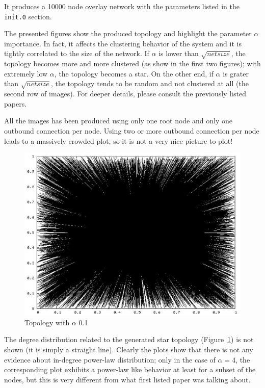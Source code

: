 \documentclass[a4paper,12pt]{article}
\begin{document}
It produces a 10000 node overlay network with the parameters listed in 
the \texttt{init.0} section.

The presented figures show the produced topology and highlight the 
parameter $\alpha$ importance. In fact, it affects the clustering behavior of 
the system and it is tightly correlated to the size of the network. If 
$\alpha$ is lower than $\sqrt{netsize}$, the topology becomes more and more 
clustered (as show in the first two figures); with extremely low $\alpha$, 
the topology becomes a star. On the other end, if $\alpha$ is grater than 
$\sqrt{netsize}$, the topology tends to be random and not clustered at all 
(the second row of images). For deeper details, please consult the previously
listed papers.

All the images has been produced using only one root node and only 
one outbound connection per node. Using two or more outbound connection 
per node leads to a massively crowded plot, so it is not a very nice picture 
to plot!

\begin{figure}
\begin{center}
\includegraphics[scale=0.6]{pic_alfa01.eps}
\end{center}
\caption{Topology with $\alpha$ 0.1\label{t01figure}}
\end{figure}


The degree distribution related to the generated star topology 
(Figure~\ref{t01figure}) is not 
shown (it is simply a straight line).
Clearly the plots show that there is not any evidence about in-degree 
power-law distribution; only in the case of $\alpha = 4$, the corresponding 
plot exhibits a power-law like behavior at least for a subset of the nodes, 
but this is very different from what first listed paper was talking about.
\end{document}
